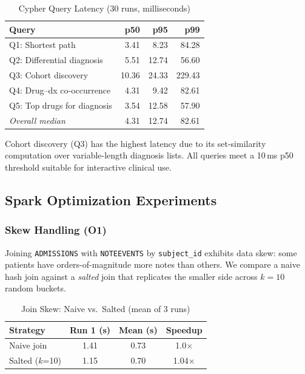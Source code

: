 \documentclass[conference]{IEEEtran}
\begin{document}
\begin{table}[htbp]
\caption{Cypher Query Latency (30 runs, milliseconds)}
\label{tab:queries}
\centering
\begin{tabular}{lrrr}
\toprule
\textbf{Query} & \textbf{p50} & \textbf{p95} & \textbf{p99} \\
\midrule
Q1: Shortest path           & 3.41  & 8.23   & 84.28  \\
Q2: Differential diagnosis  & 5.51  & 12.74  & 56.60  \\
Q3: Cohort discovery        & 10.36 & 24.33  & 229.43 \\
Q4: Drug--dx co-occurrence  & 4.31  & 9.42   & 82.61  \\
Q5: Top drugs for diagnosis & 3.54  & 12.58  & 57.90  \\
\midrule
\textit{Overall median}     & 4.31  & 12.74  & 82.61  \\
\bottomrule
\end{tabular}
\end{table}

Cohort discovery (Q3) has the highest latency due to its set-similarity
computation over variable-length diagnosis lists.
All queries meet a 10\,ms p50 threshold suitable for interactive clinical use.

\subsection{Spark Optimization Experiments}

\subsubsection{Skew Handling (O1)}

Joining \texttt{ADMISSIONS} with \texttt{NOTEEVENTS} by \texttt{subject\_id}
exhibits data skew: some patients have orders-of-magnitude more notes than
others.
We compare a naive hash join against a \textit{salted} join that replicates
the smaller side across $k=10$ random buckets.

\begin{table}[htbp]
\caption{Join Skew: Naive vs.\ Salted (mean of 3 runs)}
\label{tab:skew}
\centering
\begin{tabular}{lccc}
\toprule
\textbf{Strategy} & \textbf{Run 1 (s)} & \textbf{Mean (s)} & \textbf{Speedup} \\
\midrule
Naive join    & 1.41 & 0.73 & 1.0$\times$ \\
Salted ($k$=10) & 1.15 & 0.70 & 1.04$\times$ \\
\bottomrule
\end{tabular}
\end{table}
\end{document}
